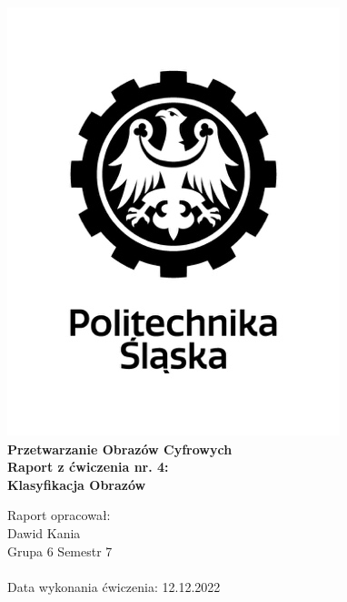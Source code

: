 
\begin{titlepage}
    \begin{center}
        \includegraphics[width=.50\linewidth]{other/polsl.png}\\
        \Huge
        \textbf{Przetwarzanie Obrazów Cyfrowych}
        \\ \vspace{1.5cm}
        \Large
        \textbf{Raport z ćwiczenia nr. 4: } \\
        \textbf{Klasyfikacja Obrazów}        
    \end{center}
    \vspace{2.5cm}
    \Large
    Raport opracował: \\
    Dawid Kania \\
    Grupa 6 Semestr 7 \\ \\
    Data wykonania ćwiczenia: 12.12.2022
\end{titlepage}
